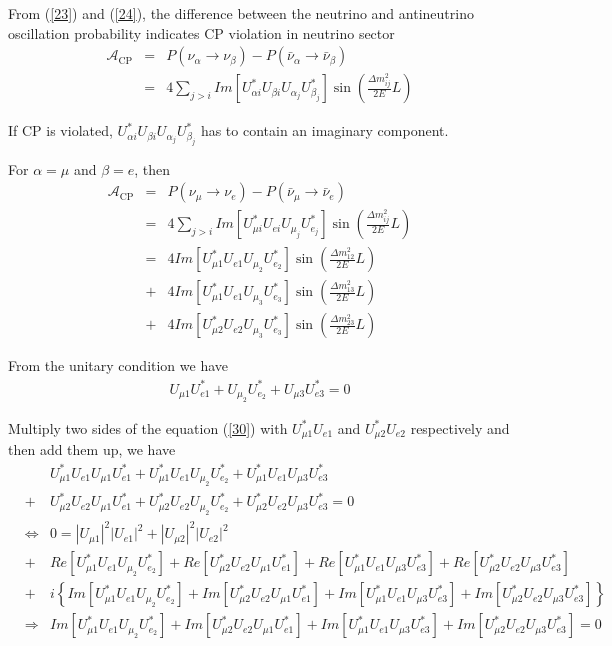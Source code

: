 \documentclass[a4 paper,12pt]{report}%
\begin{document}
From (\ref{23}) and (\ref{24}), the difference between the neutrino and antineutrino oscillation probability indicates CP violation in neutrino sector
   \begin{eqnarray}\label{27}
 \mathcal{A}_{\text{CP}} &=&P(\nu_\alpha \rightarrow \nu_\beta)-P(\bar\nu_\alpha \rightarrow \bar\nu_\beta) \nonumber\\
&=& 4\sum_{j>i}Im\left[U^*_{\alpha i}U_{\beta i}U_{\alpha_j}U^*_{\beta_j}\right]\sin(\frac{\Delta m^2_{ij}}{2E}L)
   \end{eqnarray} \par
If CP is violated, $U^*_{\alpha i}U_{\beta i}U_{\alpha_j}U^*_{\beta_j}$ has to contain an imaginary component. \par
For $\alpha = \mu$ and $\beta = e$, then
   \begin{eqnarray}\label{28} 
\mathcal{A}_{\text{CP}} &=&P(\nu_\mu \rightarrow \nu_e)-P(\bar\nu_\mu \rightarrow \bar\nu_e) \nonumber\\
&=& 4\sum_{j>i}Im\left[U^*_{\mu i}U_{e i}U_{\mu_j}U^*_{e_j}\right]\sin(\frac{\Delta m^2_{ij}}{2E}L) \\ 
&=& 4Im\left[U^*_{\mu 1}U_{e 1}U_{\mu_2}U^*_{e_2}\right]\sin(\frac{\Delta m^2_{12}}{2E}L) \nonumber \\
&+& 4Im\left[U^*_{\mu 1}U_{e 1}U_{\mu_3}U^*_{e_3}\right]\sin(\frac{\Delta m^2_{13}}{2E}L) \nonumber \\
&+& 4Im\left[U^*_{\mu 2}U_{e 2}U_{\mu_3}U^*_{e_3}\right]\sin(\frac{\Delta m^2_{23}}{2E}L)  
  \end{eqnarray} \par
From the unitary condition we have
   \begin{eqnarray}\label{30} 
U_{\mu 1}U^*_{e 1} + U_{\mu_2}U^*_{e_2} + U_{\mu 3}U^*_{e3} = 0  
  \end{eqnarray} \par
Multiply two sides of the equation (\ref{30}) with $U^*_{\mu 1} U_{e1}$ and $U^*_{\mu 2} U_{e2}$ respectively and then add them up, we have
   \begin{eqnarray}\label{31} 
& &U^*_{\mu 1} U_{e1}U_{\mu 1}U^*_{e 1} + U^*_{\mu 1} U_{e1}U_{\mu_2}U^*_{e_2} + U^*_{\mu 1} U_{e1}U_{\mu 3}U^*_{e3}\nonumber \\
 &+ &U^*_{\mu 2} U_{e2}U_{\mu 1}U^*_{e 1} + U^*_{\mu 2} U_{e2}U_{\mu_2}U^*_{e_2} + U^*_{\mu 2} U_{e2}U_{\mu 3}U^*_{e3} = 0 \nonumber\\
&\Leftrightarrow& 0 = |U_{\mu 1}|^2|U_{e1}|^2 + |U_{\mu 2}|^2 |U_{e2}|^2 \nonumber \\ 
&+& Re[U^*_{\mu 1} U_{e1}U_{\mu_2}U^*_{e_2}] + Re[U^*_{\mu 2} U_{e2}U_{\mu 1}U^*_{e 1}] + Re[U^*_{\mu 1} U_{e1}U_{\mu 3}U^*_{e3}] + Re[U^*_{\mu 2} U_{e2}U_{\mu 3}U^*_{e3}] \nonumber \\
&+& i\left\{Im[U^*_{\mu 1} U_{e1}U_{\mu_2}U^*_{e_2}] + Im[U^*_{\mu 2} U_{e2}U_{\mu 1}U^*_{e 1}] + Im[U^*_{\mu 1} U_{e1}U_{\mu 3}U^*_{e3}] + Im[U^*_{\mu 2} U_{e2}U_{\mu 3}U^*_{e3}] \right\} \nonumber \\
&\Rightarrow& Im[U^*_{\mu 1} U_{e1}U_{\mu_2}U^*_{e_2}] + Im[U^*_{\mu 2} U_{e2}U_{\mu 1}U^*_{e 1}] + Im[U^*_{\mu 1} U_{e1}U_{\mu 3}U^*_{e3}] + Im[U^*_{\mu 2} U_{e2}U_{\mu 3}U^*_{e3}] = 0 \nonumber \\
  \end{eqnarray} \par
\end{document}
